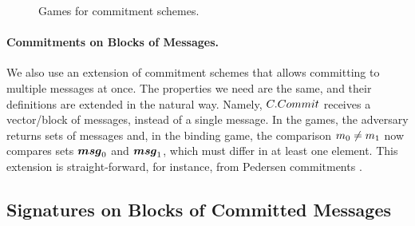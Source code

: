 \begin{figure}[ht!]
  \begin{minipage}[t]{0.5\textwidth}
  \end{minipage}
  \begin{minipage}[t]{0.5\textwidth}
  \end{minipage}
  \label{fig:nizk-games}
  \caption{Games for commitment schemes.}
\end{figure}

\paragraph{Commitments on Blocks of Messages.} We also use an extension
of commitment schemes that allows committing to multiple messages at once. The
properties we need are the same, and their definitions are extended in the
natural way. Namely, $C.Commit$ receives a vector/block of messages, \msgset
instead of a single message. In the games, the adversary returns sets of
messages and, in the binding game, the comparison $m_0 \neq m_1$ now
compares sets $\boldsymbol{msg}_0$ and $\boldsymbol{msg}_1$, which must differ in at least one
element. This extension is straight-forward, for instance, from Pedersen
commitments \cite{bcc+15}.

\subsection{Signatures on Blocks of Committed Messages}
\label{sapp:sbcm}

